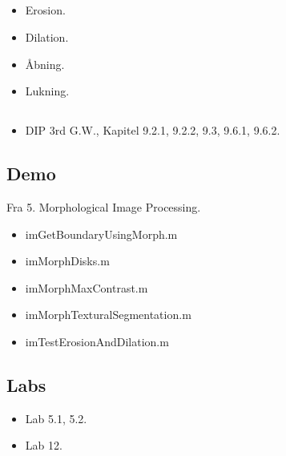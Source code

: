 \subsection{\subtopics}

\begin{itemize}
	\item Erosion.
	\item Dilation.
	\item Åbning.
	\item Lukning.
\end{itemize}

\subsection{\curriculum}

\begin{itemize}
	\item DIP 3rd G.W., Kapitel 9.2.1, 9.2.2, 9.3, 9.6.1, 9.6.2.
\end{itemize}

\subsection{Demo}

Fra 5. Morphological Image Processing.

\begin{itemize}
	\item imGetBoundaryUsingMorph.m
	\item imMorphDisks.m
	\item imMorphMaxContrast.m
	\item imMorphTexturalSegmentation.m
	\item imTestErosionAndDilation.m
\end{itemize}

\subsection{Labs}

\begin{itemize}
	\item Lab 5.1, 5.2.
	\item Lab 12.
\end{itemize}